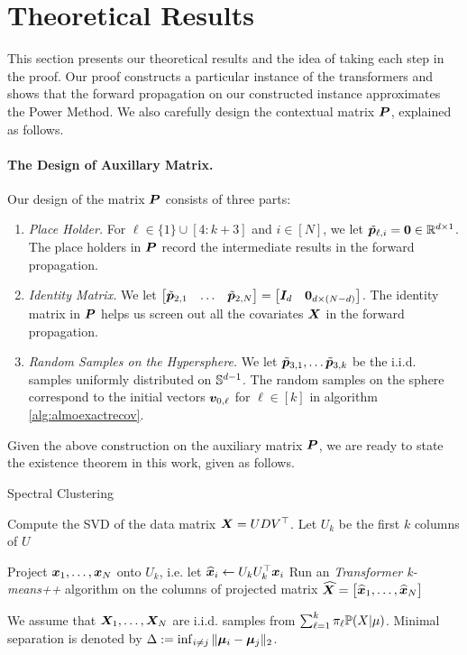 \section{Theoretical Results}\label{sect3}
This section presents our theoretical results and the idea of taking each step in the proof. Our proof constructs a particular instance of the transformers and shows that the forward propagation on our constructed instance approximates the Power Method. We also carefully design the contextual matrix $\boldsymbol{P}$, explained as follows.

\paragraph{The Design of Auxillary Matrix.} Our design of the matrix $\boldsymbol{P}$ consists of three parts:
\begin{enumerate}
    \item \emph{Place Holder.} For $\ell\in\{1\}\cup[4:k+3]$ and $i\in[N]$, we let $\tilde{\boldsymbol{p}}_{\ell, i}=\boldsymbol{0}\in\mathbb{R}^{d\times 1}$. The place holders in $\boldsymbol{P}$ record the intermediate results in the forward propagation.
    \item \emph{Identity Matrix.} We let $ \begin{bmatrix}
        \tilde{\boldsymbol{p}}_{2,1}&\ldots&\tilde{\boldsymbol{p}}_{2,N}
    \end{bmatrix}=\begin{bmatrix}
        \boldsymbol{I}_d&\boldsymbol{0}_{d\times(N-d)}
    \end{bmatrix}$. The identity matrix in $\boldsymbol{P}$ helps us screen out all the covariates $\boldsymbol{X}$ in the forward propagation.
    \item \emph{Random Samples on the Hypersphere.} We let $\tilde{\boldsymbol{p}}_{3,1},\ldots\tilde{\boldsymbol{p}}_{3,k}$ be the i.i.d. samples uniformly distributed on $\mathbb{S}^{d-1}$. The random samples on the sphere correspond to the initial vectors $\boldsymbol{v}_{0,\ell}$ for $\ell\in[k]$ in algorithm \ref{alg:almoexactrecov}.
\end{enumerate}
Given the above construction on the auxiliary matrix $\boldsymbol{P}$, we are ready to state the existence theorem in this work, given as follows.

\begin{algorithm}[htbp] 
 \caption{Spectral Clustering}
\label{alg:spectralclustering}
 Compute the SVD of the data matrix $\boldsymbol{X}=UDV^\top$. Let $U_k$ be the first $k$ columns of $U$\;

 Project $\boldsymbol{x}_1,\ldots,\boldsymbol{x}_N$ onto $U_k$, i.e. let $\widehat{\boldsymbol{x}}_i\gets U_kU_k^\top \boldsymbol{x}_i$ \;
 Run an \emph{Transformer k-means++\cite{arthur2006k}} algorithm on the columns of projected matrix $\widehat{\boldsymbol{X}}=\begin{bmatrix}
     \widehat{\boldsymbol{x}}_1,\ldots,\widehat{\boldsymbol{x}}_N
 \end{bmatrix}$\;
\end{algorithm}
\begin{assumption}\label{asumpt1}
    We assume that $\boldsymbol{X}_1,\ldots,\boldsymbol{X}_N$ are i.i.d. samples from $\sum_{\ell=1}^k\pi_\ell\mathbb{P}(X|\mu)$. Minimal separation is denoted by $\Delta:=\inf_{i\neq j}\Vert\boldsymbol{\mu}_i-\boldsymbol{\mu}_j\Vert_2$.
\end{assumption}


